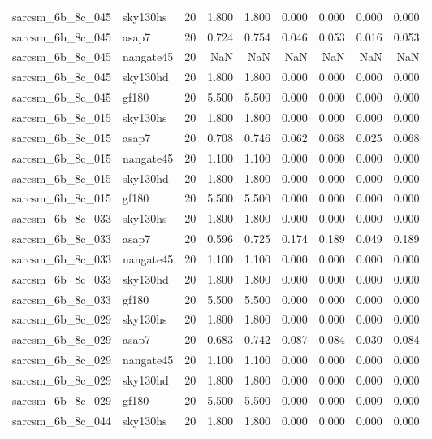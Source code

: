\begin{tabular}{llrrrrrrr}
sarcsm\_6b\_8c\_045 & sky130hs & 20 & 1.800 & 1.800 & 0.000 & 0.000 & 0.000 & 0.000 \\
sarcsm\_6b\_8c\_045 & asap7 & 20 & 0.724 & 0.754 & 0.046 & 0.053 & 0.016 & 0.053 \\
sarcsm\_6b\_8c\_045 & nangate45 & 20 & NaN & NaN & NaN & NaN & NaN & NaN \\
sarcsm\_6b\_8c\_045 & sky130hd & 20 & 1.800 & 1.800 & 0.000 & 0.000 & 0.000 & 0.000 \\
sarcsm\_6b\_8c\_045 & gf180 & 20 & 5.500 & 5.500 & 0.000 & 0.000 & 0.000 & 0.000 \\
sarcsm\_6b\_8c\_015 & sky130hs & 20 & 1.800 & 1.800 & 0.000 & 0.000 & 0.000 & 0.000 \\
sarcsm\_6b\_8c\_015 & asap7 & 20 & 0.708 & 0.746 & 0.062 & 0.068 & 0.025 & 0.068 \\
sarcsm\_6b\_8c\_015 & nangate45 & 20 & 1.100 & 1.100 & 0.000 & 0.000 & 0.000 & 0.000 \\
sarcsm\_6b\_8c\_015 & sky130hd & 20 & 1.800 & 1.800 & 0.000 & 0.000 & 0.000 & 0.000 \\
sarcsm\_6b\_8c\_015 & gf180 & 20 & 5.500 & 5.500 & 0.000 & 0.000 & 0.000 & 0.000 \\
sarcsm\_6b\_8c\_033 & sky130hs & 20 & 1.800 & 1.800 & 0.000 & 0.000 & 0.000 & 0.000 \\
sarcsm\_6b\_8c\_033 & asap7 & 20 & 0.596 & 0.725 & 0.174 & 0.189 & 0.049 & 0.189 \\
sarcsm\_6b\_8c\_033 & nangate45 & 20 & 1.100 & 1.100 & 0.000 & 0.000 & 0.000 & 0.000 \\
sarcsm\_6b\_8c\_033 & sky130hd & 20 & 1.800 & 1.800 & 0.000 & 0.000 & 0.000 & 0.000 \\
sarcsm\_6b\_8c\_033 & gf180 & 20 & 5.500 & 5.500 & 0.000 & 0.000 & 0.000 & 0.000 \\
sarcsm\_6b\_8c\_029 & sky130hs & 20 & 1.800 & 1.800 & 0.000 & 0.000 & 0.000 & 0.000 \\
sarcsm\_6b\_8c\_029 & asap7 & 20 & 0.683 & 0.742 & 0.087 & 0.084 & 0.030 & 0.084 \\
sarcsm\_6b\_8c\_029 & nangate45 & 20 & 1.100 & 1.100 & 0.000 & 0.000 & 0.000 & 0.000 \\
sarcsm\_6b\_8c\_029 & sky130hd & 20 & 1.800 & 1.800 & 0.000 & 0.000 & 0.000 & 0.000 \\
sarcsm\_6b\_8c\_029 & gf180 & 20 & 5.500 & 5.500 & 0.000 & 0.000 & 0.000 & 0.000 \\
sarcsm\_6b\_8c\_044 & sky130hs & 20 & 1.800 & 1.800 & 0.000 & 0.000 & 0.000 & 0.000 \\

\end{tabular}
